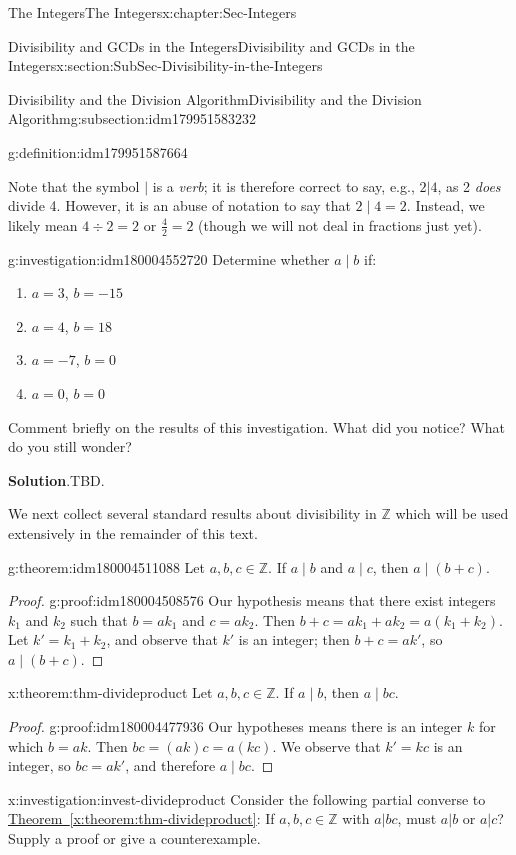 \documentclass[oneside,10pt,]{book}
\newcommand{\blocktitlefont}{\relax}
\newcommand{\xreffont}{\relax}
\numberwithin{equation}{section}
\def\Z{{\mathbb Z}}
\begin{document}
\begin{chapterptx}{The Integers}{}{The Integers}{}{}{x:chapter:Sec-Integers}
\begin{sectionptx}{Divisibility and GCDs in the Integers}{}{Divisibility and GCDs in the Integers}{}{}{x:section:SubSec-Divisibility-in-the-Integers}
\begin{subsectionptx}{Divisibility and the Division Algorithm}{}{Divisibility and the Division Algorithm}{}{}{g:subsection:idm179951583232}
\begin{definition}{}{g:definition:idm179951587664}
\end{definition}
Note that the symbol \(|\) is a \emph{verb}; it is therefore correct to say, e.g., \(2|4\), as 2 \emph{does} divide 4. However, it is an abuse of notation to say that \(2\mid 4 = 2\). Instead, we likely mean \(4\div 2 = 2\) or \(\frac{4}{2} = 2\) (though we will not deal in fractions just yet).%
\begin{investigation}{}{g:investigation:idm180004552720}%
Determine whether \(a\mid b\) if:%
\begin{enumerate}
\item{}\(a = 3\), \(b = -15\)%
\item{}\(a = 4\), \(b = 18\)%
\item{}\(a = -7\), \(b = 0\)%
\item{}\(a = 0\), \(b = 0\)%
\end{enumerate}
Comment briefly on the results of this investigation. What did you notice? What do you still wonder?%
\par\smallskip%
\noindent\textbf{\blocktitlefont Solution}.\hypertarget{g:solution:idm180004520992}{}\quad{}TBD.%
\end{investigation}
We next collect several standard results about divisibility in \(\Z\) which will be used extensively in the remainder of this text.%
\begin{theorem}{}{}{g:theorem:idm180004511088}%
Let \(a,b,c\in\Z\). If \(a\mid b\) and \(a\mid c\), then \(a\mid (b+c)\).%
\end{theorem}
\begin{proof}{}{g:proof:idm180004508576}
Our hypothesis means that there exist integers \(k_1\) and \(k_2\) such that \(b = a k_1\) and \(c = a k_2\). Then \(b+c = a k_1 + a k_2 = a(k_1 + k_2)\). Let \(k' = k_1 + k_2\), and observe that \(k'\) is an integer; then \(b+c = a k'\), so \(a\mid (b+c)\).%
\end{proof}
\begin{theorem}{}{}{x:theorem:thm-divideproduct}%
Let \(a,b,c\in\Z\). If \(a\mid b\), then \(a\mid bc\).%
\end{theorem}
\begin{proof}{}{g:proof:idm180004477936}
Our hypotheses means there is an integer \(k\) for which \(b = ak\). Then \(bc = (ak)c = a(kc)\). We observe that \(k' = kc\) is an integer, so \(bc = ak'\), and therefore \(a\mid bc\).%
\end{proof}
\begin{investigation}{}{x:investigation:invest-divideproduct}%
Consider the following partial converse to \hyperref[x:theorem:thm-divideproduct]{Theorem~{\xreffont\ref{x:theorem:thm-divideproduct}}}: If \(a,b,c\in\Z\) with \(a|bc\), must \(a|b\) or \(a|c\)? Supply a proof or give a counterexample.%

\end{investigation}
\end{subsectionptx}
\end{sectionptx}
\end{chapterptx}
\end{document}
